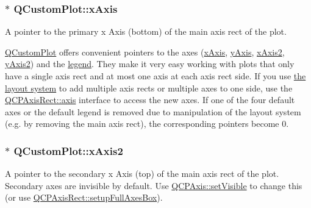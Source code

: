 \subsubsection[{\texorpdfstring{x\+Axis}{xAxis}}]{ $\ast$ Q\+Custom\+Plot\+::x\+Axis}\hypertarget{class_q_custom_plot_a9a79cd0158a4c7f30cbc702f0fd800e4}{}\label{class_q_custom_plot_a9a79cd0158a4c7f30cbc702f0fd800e4}
A pointer to the primary x Axis (bottom) of the main axis rect of the plot.

\hyperlink{class_q_custom_plot}{Q\+Custom\+Plot} offers convenient pointers to the axes (\hyperlink{class_q_custom_plot_a9a79cd0158a4c7f30cbc702f0fd800e4}{x\+Axis}, \hyperlink{class_q_custom_plot_af6fea5679725b152c14facd920b19367}{y\+Axis}, \hyperlink{class_q_custom_plot_ada41599f22cad901c030f3dcbdd82fd9}{x\+Axis2}, \hyperlink{class_q_custom_plot_af13fdc5bce7d0fabd640f13ba805c0b7}{y\+Axis2}) and the \hyperlink{class_q_custom_plot_a4eadcd237dc6a09938b68b16877fa6af}{legend}. They make it very easy working with plots that only have a single axis rect and at most one axis at each axis rect side. If you use \hyperlink{}{the layout system} to add multiple axis rects or multiple axes to one side, use the \hyperlink{class_q_c_p_axis_rect_a560de44e47a4af0f86c59102a094b1e4}{Q\+C\+P\+Axis\+Rect\+::axis} interface to access the new axes. If one of the four default axes or the default legend is removed due to manipulation of the layout system (e.\+g. by removing the main axis rect), the corresponding pointers become 0. 
\subsubsection[{\texorpdfstring{x\+Axis2}{xAxis2}}]{ $\ast$ Q\+Custom\+Plot\+::x\+Axis2}\hypertarget{class_q_custom_plot_ada41599f22cad901c030f3dcbdd82fd9}{}\label{class_q_custom_plot_ada41599f22cad901c030f3dcbdd82fd9}
A pointer to the secondary x Axis (top) of the main axis rect of the plot. Secondary axes are invisible by default. Use \hyperlink{class_q_c_p_layerable_a3bed99ddc396b48ce3ebfdc0418744f8}{Q\+C\+P\+Axis\+::set\+Visible} to change this (or use \hyperlink{class_q_c_p_axis_rect_a5fa906175447b14206954f77fc7f1ef4}{Q\+C\+P\+Axis\+Rect\+::setup\+Full\+Axes\+Box}).

